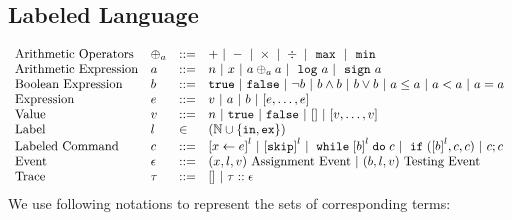 \subsection{Labeled Language}
\[
\begin{array}{llll}
\mbox{Arithmetic Operators} 
& \oplus_a & ::= & + ~|~ - ~|~ \times 
%
~|~ \div ~|~ \emax ~|~ \emin
\\  
\mbox{Arithmetic Expression} 
& \aexpr & ::= & 
n ~|~ {x} ~|~ \aexpr \oplus_a \aexpr  
 ~|~ \elog \aexpr  ~|~ \esign \aexpr
\\
%
\mbox{Boolean Expression} & \bexpr & ::= & 
%
\etrue ~|~ \efalse  ~|~ \neg \bexpr
 ~|~ \bexpr \land \bexpr
%
~|~ \bexpr \lor \bexpr
~|~ \aexpr \leq \aexpr 
~|~ \aexpr < \aexpr 
~|~ \aexpr = \aexpr 
\\
%
\mbox{Expression} & \expr & ::= & v ~|~ \aexpr ~|~ \bexpr ~|~ [\expr, \dots, \expr]
\\  
%
\mbox{Value} 
& v & ::= & { n ~|~ \etrue ~|~ \efalse ~|~ [] ~|~ [v, \dots, v]} \\
%
\mbox{Label} 
& l & \in & (\mathbb{N} \cup \{\lin, \lex\}) 
\\ 
%
\mbox{Labeled Command} 
& {c} & ::= &  
\clabel{\assign{x}{\expr}}^l 
~|~  \clabel{\eskip}^l
~|~ \ewhile \clabel{\bexpr}^{l} \edo {c}
~|~ \eif(\clabel{\bexpr}^{l} , {c}, {c}) 
~|~ {c};{c}  
\\ 
\mbox{Event} 
& \event & ::= & 
({x}, l, v) ~ \mbox{Assignment Event} 
~|~(\bexpr, l, v) ~ \mbox{Testing Event}
\\
\mbox{Trace} & \trace
& ::= & [] ~|~ \trace :: \event
\\
\end{array}
\]
We use following notations to represent the sets of corresponding terms:
